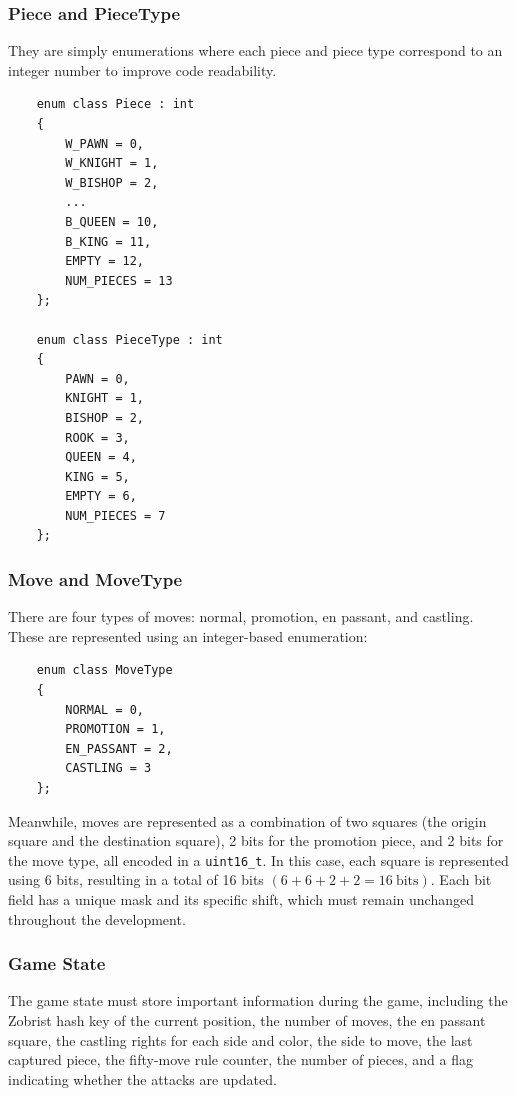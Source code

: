 \subsubsection{Piece and PieceType}

They are simply enumerations where each piece and piece type correspond to an integer number to improve code readability.

\begin{lstlisting}
    enum class Piece : int
    {
        W_PAWN = 0,
        W_KNIGHT = 1,
        W_BISHOP = 2,
        ...
        B_QUEEN = 10,
        B_KING = 11,
        EMPTY = 12,
        NUM_PIECES = 13
    };

    enum class PieceType : int
    {
        PAWN = 0,
        KNIGHT = 1,
        BISHOP = 2,
        ROOK = 3,
        QUEEN = 4,
        KING = 5,
        EMPTY = 6,
        NUM_PIECES = 7
    };
\end{lstlisting}

\subsubsection{Move and MoveType}

There are four types of moves: normal, promotion, en passant, and castling. These are represented using an integer-based enumeration:

\begin{lstlisting}
    enum class MoveType
    {
        NORMAL = 0,
        PROMOTION = 1,
        EN_PASSANT = 2,
        CASTLING = 3
    };
\end{lstlisting}

\noindent Meanwhile, moves are represented as a combination of two squares (the origin square and the destination square), 2 bits for the promotion piece, and 2 bits for the move type, all encoded in a \texttt{uint16\_t}. In this case, each square is represented using 6 bits, resulting in a total of 16 bits $(6 + 6 + 2 + 2 = 16~\mathrm{bits})$. Each bit field has a unique mask and its specific shift, which must remain unchanged throughout the development.

\subsubsection{Game State}

The game state must store important information during the game, including the Zobrist hash key of the current position, the number of moves, the en passant square, the castling rights for each side and color, the side to move, the last captured piece, the fifty-move rule counter, the number of pieces, and a flag indicating whether the attacks are updated.


